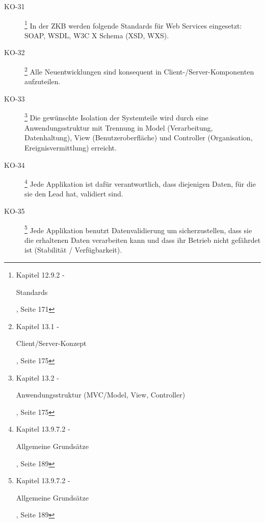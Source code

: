\begin{description}
    \item[KO-31\label{itm:KO-31}]
    \footnote{\cite{ZkbHandbuchDerItArchitektur} Kapitel 12.9.2 -
    \begin{itshape}Standards\end{itshape}, Seite 171}
    In der ZKB werden folgende Standards für Web Services eingesetzt: SOAP,
    WSDL, W3C X Schema (XSD, WXS).
    
    \item[KO-32\label{itm:KO-32}]
    \footnote{\cite{ZkbHandbuchDerItArchitektur} Kapitel 13.1 -
    \begin{itshape}Client/Server-Konzept\end{itshape}, Seite 175}
    Alle Neuentwicklungen sind konsequent in Client-/Server-Komponenten
    aufzuteilen.
    
    \item[KO-33\label{itm:KO-33}]
    \footnote{\cite{ZkbHandbuchDerItArchitektur} Kapitel 13.2 -
    \begin{itshape}Anwendungsstruktur (MVC/Model, View,
    Controller)\end{itshape}, Seite 175}
    Die gewünschte Isolation der Systemteile wird durch eine Anwendungsstruktur
    mit Trennung in Model (Verarbeitung, Datenhaltung), View
    (Benutzeroberfläche) und Controller (Organisation, Ereignisvermittlung)
    erreicht.
    
    \item[KO-34\label{itm:KO-34}]
    \footnote{\cite{ZkbHandbuchDerItArchitektur} Kapitel 13.9.7.2 -
    \begin{itshape}Allgemeine Grundsätze\end{itshape}, Seite 189}
    Jede Applikation ist dafür verantwortlich, dass diejenigen Daten, für die
    sie den Lead hat, validiert sind.
    
    \item[KO-35\label{itm:KO-35}]
    \footnote{\cite{ZkbHandbuchDerItArchitektur} Kapitel 13.9.7.2 -
    \begin{itshape}Allgemeine Grundsätze\end{itshape}, Seite 189}
    Jede Applikation benutzt Datenvalidierung um sicherzustellen, dass sie die
    erhaltenen Daten verarbeiten kann und dass ihr Betrieb nicht gefährdet ist
    (Stabilität / Verfügbarkeit).
    

\end{description}
